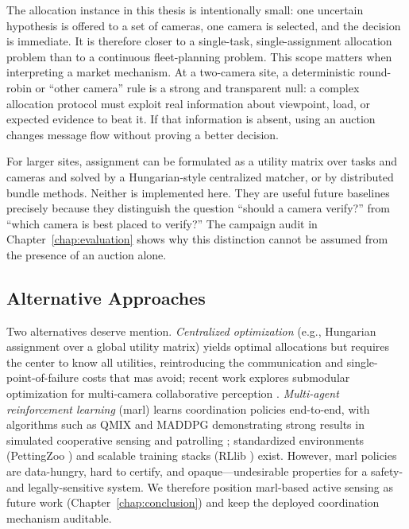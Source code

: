 The allocation instance in this thesis is intentionally small: one uncertain
hypothesis is offered to a set of cameras, one camera is selected, and the
decision is immediate. It is therefore closer to a single-task,
single-assignment allocation problem than to a continuous fleet-planning
problem. This scope matters when interpreting a market mechanism. At a
two-camera site, a deterministic round-robin or ``other camera'' rule is a
strong and transparent null: a complex allocation protocol must exploit real
information about viewpoint, load, or expected evidence to beat it. If that
information is absent, using an auction changes message flow without proving a
better decision.

For larger sites, assignment can be formulated as a utility matrix over tasks
and cameras and solved by a Hungarian-style centralized matcher, or by
distributed bundle methods. Neither is implemented here. They are useful
future baselines precisely because they distinguish the question ``should a
camera verify?'' from ``which camera is best placed to verify?'' The campaign
audit in Chapter~\ref{chap:evaluation} shows why this distinction cannot be
assumed from the presence of an auction alone.

\subsection{Alternative Approaches}

Two alternatives deserve mention. \emph{Centralized optimization} (e.g., Hungarian assignment over a global utility matrix) yields optimal allocations but requires the center to know all utilities, reintroducing the communication and single-point-of-failure costs that \gls{mas} avoid; recent work explores submodular optimization for multi-camera collaborative perception \cite{liu2026submodular}. \emph{Multi-agent reinforcement learning} (\gls{marl}) learns coordination policies end-to-end, with algorithms such as QMIX \cite{rashid2018qmix} and MADDPG \cite{lowe2017multiagent} demonstrating strong results in simulated cooperative sensing and patrolling \cite{zheng2026multiuav, yang2025multiagent}; standardized environments (PettingZoo \cite{terry2021pettingzoo}) and scalable training stacks (RLlib \cite{liang2018rllib}) exist. However, \gls{marl} policies are data-hungry, hard to certify, and opaque---undesirable properties for a safety- and legally-sensitive system. We therefore position \gls{marl}-based active sensing as future work (Chapter~\ref{chap:conclusion}) and keep the deployed coordination mechanism auditable.

